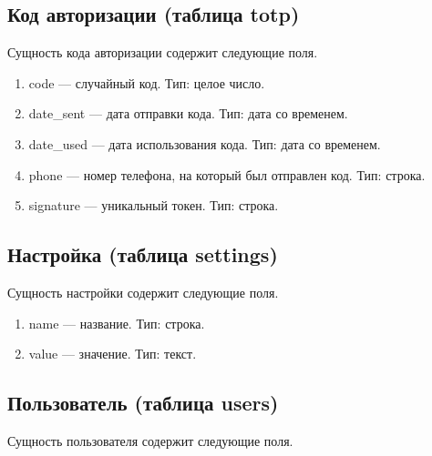 \subsection{Код авторизации (таблица totp)}

Сущность кода авторизации содержит следующие поля.

\begin{enumerate}
    \item code --- случайный код. Тип: целое число. 
    \item date\_sent --- дата отправки кода. Тип: дата со временем. 
    \item date\_used --- дата использования кода. Тип: дата со временем.
    \item phone --- номер телефона, на который был отправлен код. Тип: строка. 
    \item signature --- уникальный токен. Тип: строка. 
\end{enumerate}

\subsection{Настройка (таблица settings)}

Сущность настройки содержит следующие поля.

\begin{enumerate}
    \item name --- название. Тип: строка.
    \item value --- значение. Тип: текст.
\end{enumerate}

\subsection{Пользователь (таблица users)}

Сущность пользователя содержит следующие поля.

